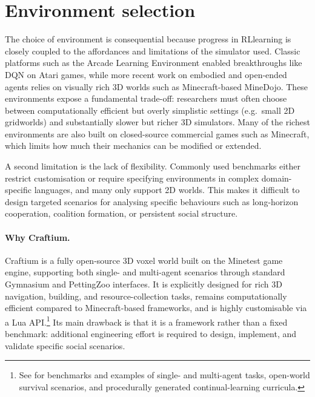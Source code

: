 \section{Environment selection}
\label{sec:env_selection}

The choice of environment is consequential because progress in RLlearning is closely coupled to the affordances and limitations of the simulator used. Classic platforms such as the Arcade Learning Environment enabled breakthroughs like DQN on Atari games, while more recent work on embodied and open-ended agents relies on visually rich 3D worlds such as Minecraft-based MineDojo. These environments expose a fundamental trade-off: researchers must often choose between computationally efficient but overly simplistic settings (e.g.\ small 2D gridworlds) and substantially slower but richer 3D simulators. Many of the richest environments are also built on closed-source commercial games such as Minecraft, which limits how much their mechanics can be modified or extended.

A second limitation is the lack of flexibility. Commonly used benchmarks either restrict customisation or require specifying environments in complex domain-specific languages, and many only support 2D worlds. This makes it difficult to design targeted scenarios for analysing specific behaviours such as long-horizon cooperation, coalition formation, or persistent social structure.

\paragraph{Why Craftium.} Craftium \cite{malagoncraftium} is a fully open-source 3D voxel world built on the Minetest game engine, supporting both single- and multi-agent scenarios through standard Gymnasium and PettingZoo interfaces. It is explicitly designed for rich 3D navigation, building, and resource-collection tasks, remains computationally efficient compared to Minecraft-based frameworks, and is highly customisable via a Lua API.\footnote{See \cite{malagoncraftium} for benchmarks and examples of single- and multi-agent tasks, open-world survival scenarios, and procedurally generated continual-learning curricula.} Its main drawback is that it is a framework rather than a fixed benchmark: additional engineering effort is required to design, implement, and validate specific social scenarios.


